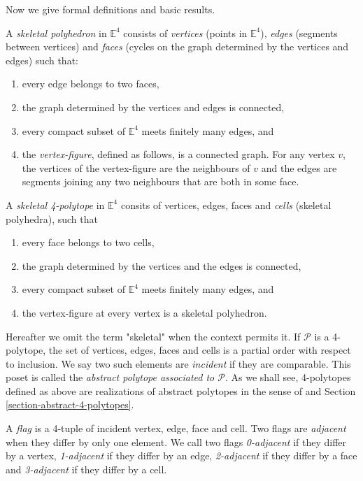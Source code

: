 \noindent
Now we give formal definitions and basic
results.

A \textit{skeletal polyhedron} in
$\mathbb{E}^4$ consists of \textit{vertices}
(points in $\mathbb{E}^4$), \textit{edges}
(segments between vertices) and
\textit{faces} (cycles on the graph
determined by the vertices and edges) such
that:
\begin{enumerate}
\item every edge belongs to two faces,
\item the graph determined by the vertices
and edges is connected,
\item every compact subset of $\mathbb{E}^4$
meets finitely many edges, and
\item the \textit{vertex-figure}, defined as
follows, is a connected graph. For any vertex
$v$, the vertices of the vertex-figure are
the neighbours of $v$ and the edges are
segments joining any two neighbours that are
both in some face.
\end{enumerate}
A \textit{skeletal 4-polytope} in
$\mathbb{E}^4$ consits of vertices, edges,
faces and \textit{cells} (skeletal
polyhedra), such that
\begin{enumerate}
\item every face belongs to two cells,
\item the graph determined by the vertices
and the edges is connected,
\item every compact subset of $\mathbb{E}^4$
meets finitely many edges, and
\item the vertex-figure at every vertex is a
skeletal polyhedron.
\end{enumerate}

Hereafter we omit the term "skeletal" when
the context permits it. If $\mathcal{P}$ is a
4-polytope, the set of vertices, edges, faces
and cells is a partial order with respect to
inclusion. We say two such elements are
\textit{incident} if they are comparable.
This poset is called the \textit{abstract
polytope associated to $\mathcal{P}$}. As we
shall see, 4-polytopes defined as above are
realizations of abstract polytopes in the
sense of \cite{abstract-polytopes} and
Section \ref{section-abstract-4-polytopes}.

A \textit{flag} is a 4-tuple of incident
vertex, edge, face and cell. Two flags are
\textit{adjacent} when they differ by only
one element. We call two flags
\textit{0-adjacent} if they differ by a
vertex, \textit{1-adjacent} if they differ by
an edge, \textit{2-adjacent} if they differ
by a face and \textit{3-adjacent} if they
differ by a cell.

